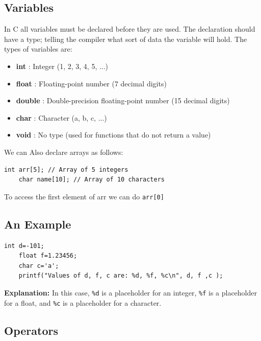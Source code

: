 \documentclass[a4paper, 10pt]{article}
\begin{document}
\subsection{Variables}
In C all variables must be declared before they are used. The declaration should have a type; telling the compiler what sort of data the variable will hold. The types of variables are:
\begin{itemize}
    \item \textbf{int} : Integer (1, 2, 3, 4, 5, ...)
    \item \textbf{float} : Floating-point number (7 decimal digits)
    \item \textbf{double} : Double-precision floating-point number (15 decimal digits)
    \item \textbf{char} : Character (a, b, c, ...)
    \item \textbf{void} : No type  (used for functions that do not return a value)
\end{itemize}

We can Also declare arrays as follows:
\begin{lstlisting}[style=cStyle, caption={Declaring Arrays}]
    int arr[5]; // Array of 5 integers
    char name[10]; // Array of 10 characters
\end{lstlisting}
To access the first element of arr we can do \texttt{arr[0]}
\subsection{An Example}
\begin{lstlisting}[style=cStyle, caption={Example of Variables}]
    int d=-101;
    float f=1.23456;
    char c='a';
    printf("Values of d, f, c are: %d, %f, %c\n", d, f ,c );
\end{lstlisting}
\textbf{Explanation:} In this case, \texttt{\%d} is a placeholder for an integer, \texttt{\%f} is a placeholder for a float, and \texttt{\%c} is a placeholder for a character.

\subsection{Operators}
\end{document}
